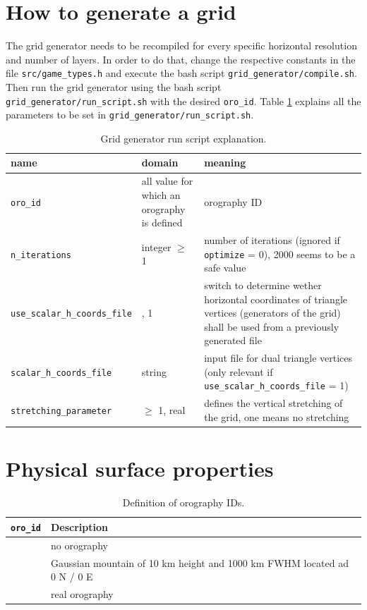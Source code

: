 \documentclass[10pt]{report}
\begin{document}
\section{How to generate a grid}
\label{sec:how_to_generate_a_grid}

The grid generator needs to be recompiled for every specific horizontal resolution and number of layers. In order to do that, change the respective constants in the file \texttt{src/game\_types.h} and execute the bash script \texttt{grid\_generator/compile.sh}. Then run the grid generator using the bash script \texttt{grid\_generator/run\_script.sh} with the desired \texttt{\texttt{oro\_id}}. Table \ref{tab:grid_generator_run_file_explanation} explains all the parameters to be set in \texttt{grid\_generator/run\_script.sh}.

\renewcommand{\arraystretch}{1.2}
\begin{table}
\centering
\begin{tabular}{|>{\centering}p{5.0 cm}|>{\centering}p{3 cm}|>{\centering}p{7 cm}|}
\hline \textbf{name} & \textbf{domain} & \textbf{meaning} \tabularnewline
\hline\hline \texttt{\texttt{oro\_id}} & all value for which an orography is defined & orography ID \tabularnewline
\hline\hline \texttt{n\_iterations} & integer $\geq$ 1 & number of iterations (ignored if \texttt{optimize} = 0), 2000 seems to be a safe value \tabularnewline
\hline\hline \texttt{use\_scalar\_h\_coords\_file} & 0, 1 & switch to determine wether horizontal coordinates of triangle vertices (generators of the grid) shall be used from a previously generated file \tabularnewline
\hline\hline \texttt{scalar\_h\_coords\_file} & string & input file for dual triangle vertices (only relevant if \texttt{use\_scalar\_h\_coords\_file} = 1) \tabularnewline
\hline\hline \texttt{stretching\_parameter} & $\geq$ 1, real & defines the vertical stretching of the grid, one means no stretching \tabularnewline
\hline
\end{tabular}
\caption{Grid generator run script explanation.}
\label{tab:grid_generator_run_file_explanation}
\end{table}
\renewcommand{\arraystretch}{1}

\section{Physical surface properties}
\label{sec:physical_surface_properties}

\renewcommand{\arraystretch}{1.2}
\begin{table}
\centering
\begin{tabular}{|>{\centering}p{4.0 cm}|>{\centering}p{8 cm}|}
\hline \textbf{\texttt{oro\_id}} & \textbf{Description} \tabularnewline
\hline\hline 0 & no orography \tabularnewline
\hline 1 & Gaussian mountain of 10 km height and 1000 km FWHM located ad 0 N / 0 E\tabularnewline
\hline 2 & real orography \tabularnewline
\hline
\end{tabular}
\caption{Definition of orography IDs.}
\label{tab:oro_id_definition}
\end{table}
\renewcommand{\arraystretch}{1}
\end{document}

